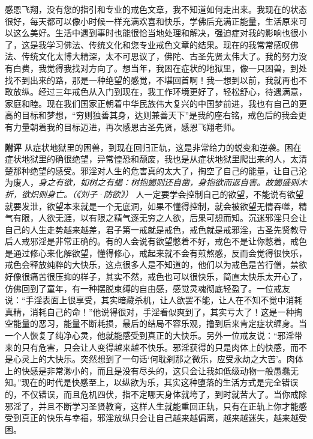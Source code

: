 \begin{case}
    感恩飞翔，没有您的指引和专业的戒色文章，我不知道如何走出来。我现在的状态很好，每天都可以像小时候一样充满欢喜和快乐，学佛后充满正能量，生活原来可以这么美好。生活中遇到事时也能很恰当地处理和解决，强迫症对我的影响也很小了，这是我学习佛法、传统文化和您专业戒色文章的结果。现在的我常常感叹佛法、传统文化太博大精深，太不可思议了，佛陀、古圣先贤太伟大了。我的努力没有白费，我觉得我找对方向了。想当年，我困在症状的地狱里，像一只困兽，到处找不到出来的路，那是一种绝望的感觉，不堪回首啊！我一想到以前，我就再也不敢放纵。经过三年戒色从入门到现在，我工作环境更好了，轻松舒心，待遇满意，家庭和睦。现在我们国家正朝着中华民族伟大复兴的中国梦前进，我也有自己的更高的目标和梦想，“穷则独善其身，达则兼善天下”是我的座右铭，戒色后的我会更有力量朝着我的目标迈进，再次感恩古圣先贤，感恩飞翔老师。

    \textbf{附评} 从症状地狱里的困兽，到现在回归正轨，这是非常给力的蜕变和逆袭。困在症状地狱里的确很绝望，异常惶恐和颓废，我也是从症状地狱里爬出来的人，太清楚那种绝望的感受。邪淫对人生的危害真的太大了，掏空了自己的能量，让自己沦为废人，\textit{身之有欲，如树之有蝎：树抱蝎则还自凿，身抱欲而返自害。故蝎盛则木折，欲炽则身亡。（《刘子·防欲》）} 人一定要学会控制自己的欲望，不能说有欲望就要发泄，欲望本来就是一个无底洞，如果不懂得控制，就会被欲望无情吞噬，精气有限，人欲无涯，以有限之精气逐无穷之人欲，后果可想而知。沉迷邪淫只会让自己的人生走势越来越差，君子第一戒就是戒色，戒色就是戒邪淫，古圣先贤教导后人戒邪淫是非常正确的。有的人会说有欲望憋着不好，戒色不是让你憋着，戒色是通过修心来化解欲望，懂得修心，戒起来就不会有煎熬感，反而会觉得很快乐，戒色会释放纯粹的大快乐，这点很多人是不知道的，他们以为戒色是苦行僧，禁欲好像很痛苦很压抑的样子，其实不然，戒色也可以很快乐，简直太快乐太开心了，仿佛回到了童年，有一种摆脱束缚的自由感，感觉灵魂彻底轻盈了。一位戒友说：“手淫表面上很享受，其实暗藏杀机，让人欲罢不能，让人在不知不觉中消耗真精，消耗自己的命！”他说得很对，手淫看似爽到了，其实亏大了！这是一种掏空能量的恶习，能量不断耗损，最后的结局不容乐观，撸到后来肯定症状缠身。当一个人恢复了纯净心灵，他就能感受到真正的大快乐。另外一位戒友说：“邪淫带来的只有危害，只会让人变得越来越不快乐。邪淫获得的只是肉体上的快感，而不是心灵上的大快乐。突然想到了一句话‘何耽刹那之微乐，应受永劫之大苦’。肉体上的快感是非常渺小的，而且是没有尽头的，这只会让我如低级动物一般愚蠢无知。”现在的时代是快感至上，以纵欲为乐，其实这种堕落的生活方式是完全错误的，不仅错误，而且危机四伏，指不定哪天身体就垮了，到时就苦大了。当你戒除邪淫了，并且不断学习圣贤教育，这样人生就能重回正轨，只有在正轨上你才能感受到真正的快乐与幸福，邪淫放纵只会让自己越来越偏离，越来越迷失，越来越受困。
\end{case}

